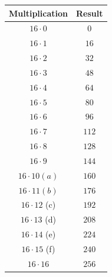 \documentclass[letterpaper,12pt]{exam}
\begin{document}
\par
\begin{center}
\begin{tabular}{| c | c |}
 \hline
    Multiplication & Result \\
    \hline
 $16 \cdot 0 $ & $ 0 $ \\ 
 $16 \cdot 1 $ & $ 16 $ \\ 
\hline
 $16 \cdot 2 $ & $ 32 $ \\ 
 $16 \cdot 3 $ & $ 48 $ \\ 
\hline
 $16 \cdot 4 $ & $ 64 $ \\ 
 $16 \cdot 5 $ & $ 80 $ \\ 
\hline
 $16 \cdot 6 $ & $ 96 $ \\ 
 $16 \cdot 7 $ & $ 112 $ \\ 
\hline
 $16 \cdot 8 $ & $ 128 $ \\ 
 $16 \cdot 9 $ & $ 144 $ \\ 
\hline
$16 \cdot 10  (a)$ & $ 160 $ \\ 
$16 \cdot 11  (b) $ & $ 176 $ \\ 
\hline
$16 \cdot 12 $ (c) & $ 192 $ \\ 
$16 \cdot 13 $  (d) & $ 208 $ \\ 
\hline
$16 \cdot 14 $  (e)& $ 224 $ \\ 
$16 \cdot 15 $  (f) & $ 240 $ \\ 
\hline
 $16 \cdot 16 $ & $ 256 $ \\   
\hline
\end{tabular}


\end{center}
\end{document}
